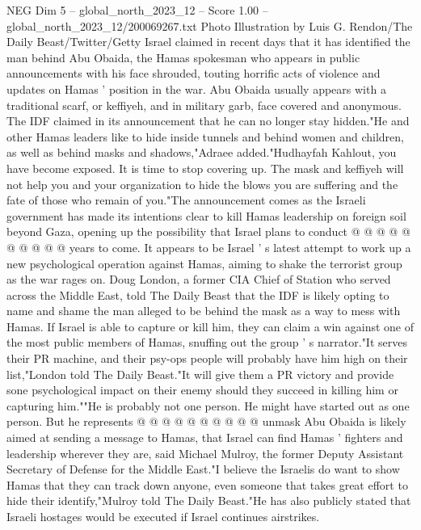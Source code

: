 \begin{textsample}{NEG Dim 5 – global\_north\_2023\_12 – Score 1.00 – global\_north\_2023\_12/200069267.txt}  \label{ex:f5_neg_059}
Photo Illustration by Luis G.
Rendon/The Daily Beast/Twitter/Getty Israel claimed in recent days that it has identified the man behind Abu Obaida, the Hamas spokesman who appears in public announcements with his face shrouded, touting horrific acts of violence and updates on Hamas ' position in the war.
Abu Obaida usually appears with a traditional scarf, or keffiyeh, and in military garb, face covered and anonymous.
The IDF claimed in its announcement that he can no longer stay hidden."He and other Hamas leaders like to hide inside tunnels and behind women and children, as well as behind masks and shadows,"Adraee added."Hudhayfah Kahlout, you have become exposed.
It is time to stop covering up.
The mask and keffiyeh will not help you and your organization to hide the blows you are suffering and the fate of those who remain of you."The announcement comes as the Israeli government has made its intentions clear to kill Hamas leadership on foreign soil beyond Gaza, opening up the possibility that Israel plans to conduct @ @ @ @ @ @ @ @ @ @ years to come.
It appears to be Israel ' s latest attempt to work up a new psychological operation against Hamas, aiming to shake the terrorist group as the war rages on.
Doug London, a former CIA Chief of Station who served across the Middle East, told The Daily Beast that the IDF is likely opting to name and shame the man alleged to be behind the mask as a way to mess with Hamas.
If Israel is able to capture or kill him, they can claim a win against one of the most public members of Hamas, snuffing out the group ' s narrator."It serves their PR machine, and their psy-ops people will probably have him high on their list,"London told The Daily Beast."It will give them a PR victory and provide sone psychological impact on their enemy should they succeed in killing him or capturing him.""He is probably not one person.
He might have started out as one person.
But he represents @ @ @ @ @ @ @ @ @ @ unmask Abu Obaida is likely aimed at sending a message to Hamas, that Israel can find Hamas ' fighters and leadership wherever they are, said Michael Mulroy, the former Deputy Assistant Secretary of Defense for the Middle East."I believe the Israelis do want to show Hamas that they can track down anyone, even someone that takes great effort to hide their identify,"Mulroy told The Daily Beast."He has also publicly stated that Israeli hostages would be executed if Israel continues airstrikes.

\end{textsample}
